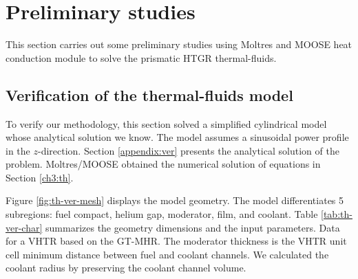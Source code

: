 \section{Preliminary studies}

This section carries out some preliminary studies using Moltres and MOOSE heat conduction module to solve the prismatic HTGR thermal-fluids.

\subsection{Verification of the thermal-fluids model}

To verify our methodology, this section solved a simplified cylindrical model whose analytical solution we know.
The model assumes a sinusoidal power profile in the $z$-direction.
Section \ref{appendix:ver} presents the analytical solution of the problem.
Moltres/MOOSE obtained the numerical solution of equations in Section \ref{ch3:th}.

Figure \ref{fig:th-ver-mesh} displays the model geometry.
The model differentiates 5 subregions: fuel compact, helium gap, moderator, film, and coolant.
Table \ref{tab:th-ver-char} summarizes the geometry dimensions and the input parameters.
Data for a VHTR based on the GT-MHR.
The moderator thickness is the VHTR unit cell minimum distance between fuel and coolant channels.
We calculated the coolant radius by preserving the coolant channel volume.

